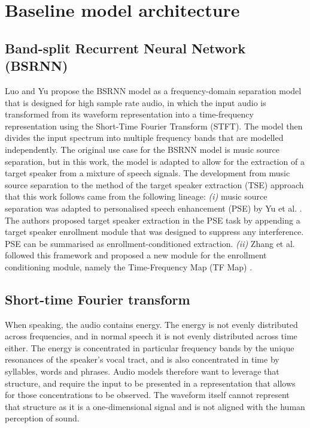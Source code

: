 \section{Baseline model architecture}
\label{sec:architecture}


\subsection{Band-split Recurrent Neural Network (BSRNN)}
\label{sec:bsrnn}
Luo and Yu \cite{luo2023music} propose the BSRNN model as a frequency-domain separation model that is designed for high sample rate audio, in which the input audio is transformed from its waveform representation into a time-frequency representation using the Short-Time Fourier Transform (STFT). The model then divides the input spectrum into multiple frequency bands that are modelled independently. The original use case for the BSRNN model is music source separation, but in this work, the model is adapted to allow for the extraction of a target speaker from a mixture of speech signals. The development from music source separation to the method of the target speaker extraction (TSE) approach that this work follows came from the following lineage: \textit{(i)} music source separation was adapted to personalised speech enhancement (PSE) by Yu et al. \cite{yu2023high}. The authors proposed target speaker extraction in the PSE task by appending a target speaker enrollment module that was designed to suppress any interference. PSE can be summarised as enrollment-conditioned extraction. \textit{(ii)} Zhang et al. followed this framework and proposed a new module for the enrollment conditioning module, namely the Time-Frequency Map (TF Map) \cite{zhang2025multi}.


\subsection{Short-time Fourier transform}
\label{sec:stft}

When speaking, the audio contains energy. The energy is not evenly distributed across frequencies, and in normal speech it is not evenly distributed across time either. The energy is concentrated in particular frequency bands by the unique resonances of the speaker's vocal tract, and is also concentrated in time by syllables, words and phrases. Audio models therefore want to leverage that structure, and require the input to be presented in a representation that allows for those concentrations to be observed. The waveform itself cannot represent that structure as it is a one-dimensional signal and is not aligned with the human perception of sound. 

